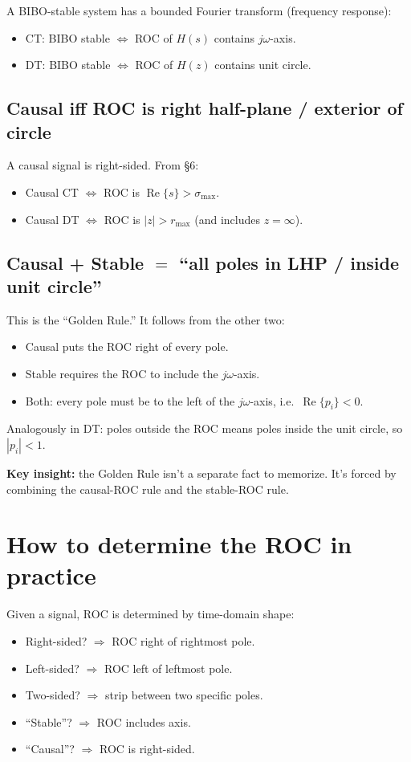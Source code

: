 \documentclass[11pt]{article}
\begin{document}
A BIBO-stable system has a bounded Fourier transform (frequency response):
\begin{itemize}
  \item CT: BIBO stable $\iff$ ROC of $H(s)$ contains $j\omega$-axis.
  \item DT: BIBO stable $\iff$ ROC of $H(z)$ contains unit circle.
\end{itemize}

\subsection{Causal iff ROC is right half-plane / exterior of circle}

A causal signal is right-sided. From \S6:
\begin{itemize}
  \item Causal CT $\iff$ ROC is $\operatorname{Re}\{s\} > \sigma_{\max}$.
  \item Causal DT $\iff$ ROC is $|z| > r_{\max}$ (and includes $z = \infty$).
\end{itemize}

\subsection{Causal + Stable $=$ ``all poles in LHP / inside unit circle''}

This is the ``Golden Rule.'' It follows from the other two:
\begin{itemize}
  \item Causal puts the ROC right of every pole.
  \item Stable requires the ROC to include the $j\omega$-axis.
  \item Both: every pole must be to the left of the $j\omega$-axis, i.e.\ $\operatorname{Re}\{p_i\}<0$.
\end{itemize}

Analogously in DT: poles outside the ROC means poles inside the unit circle, so $|p_i|<1$.

\textbf{Key insight:} the Golden Rule isn't a separate fact to memorize. It's forced by combining the causal-ROC rule and the stable-ROC rule.

\section{How to determine the ROC in practice}

Given a signal, ROC is determined by time-domain shape:
\begin{itemize}
  \item Right-sided? $\Rightarrow$ ROC right of rightmost pole.
  \item Left-sided? $\Rightarrow$ ROC left of leftmost pole.
  \item Two-sided? $\Rightarrow$ strip between two specific poles.
  \item ``Stable''? $\Rightarrow$ ROC includes axis.
  \item ``Causal''? $\Rightarrow$ ROC is right-sided.
\end{itemize}
\end{document}
